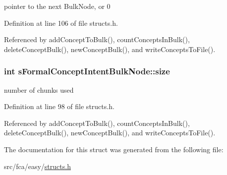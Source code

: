 pointer to the next \-Bulk\-Node, or 0 



\-Definition at line 106 of file structs.\-h.



\-Referenced by add\-Concept\-To\-Bulk(), count\-Concepts\-In\-Bulk(), delete\-Concept\-Bulk(), new\-Concept\-Bulk(), and write\-Concepts\-To\-File().

\hypertarget{structsFormalConceptIntentBulkNode_afc96b660c7becf5517e4391846e0975f}{
\subsubsection[{size}]{\setlength{\rightskip}{0pt plus 5cm}int {\bf s\-Formal\-Concept\-Intent\-Bulk\-Node\-::size}}}\label{structsFormalConceptIntentBulkNode_afc96b660c7becf5517e4391846e0975f}


number of chunks used 



\-Definition at line 98 of file structs.\-h.



\-Referenced by add\-Concept\-To\-Bulk(), count\-Concepts\-In\-Bulk(), delete\-Concept\-Bulk(), new\-Concept\-Bulk(), and write\-Concepts\-To\-File().



\-The documentation for this struct was generated from the following file\-:\begin{DoxyCompactItemize}
\item 
src/fca/easy/\hyperlink{easy_2structs_8h}{structs.\-h}\end{DoxyCompactItemize}
